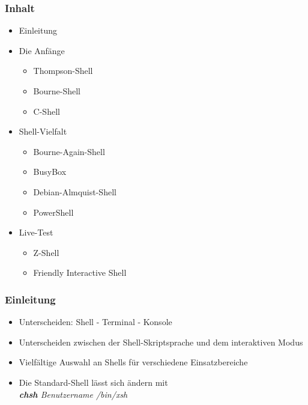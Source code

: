 \begin{frame}
    \titlepage
\end{frame}

\begin{frame}
    \frametitle{Inhalt}
    \begin{itemize}
        \item Einleitung
        \item Die Anfänge
        \begin{itemize}
            \item Thompson-Shell
            \item Bourne-Shell
            \item C-Shell
        \end{itemize}
        \pause
        \item Shell-Vielfalt
        \begin{itemize}
            \item Bourne-Again-Shell
            \item BusyBox
            \item Debian-Almquist-Shell
            \item PowerShell
        \end{itemize}
        \pause
        \item Live-Test
        \begin{itemize}
            \item Z-Shell
            \item Friendly Interactive Shell
        \end{itemize}
    \end{itemize}
\end{frame}

\begin{frame}
    \frametitle{Einleitung}
    \begin{itemize}
        \item Unterscheiden: Shell - Terminal - Konsole
        \pause
        \item Unterscheiden zwischen der Shell-Skriptsprache und dem interaktiven Modus
        \pause
        \item Vielfältige Auswahl an Shells für verschiedene Einsatzbereiche
        \item Die Standard-Shell lässt sich ändern mit\\\textit{\textbf{chsh} Benutzername /bin/xsh}
    \end{itemize}
\end{frame}
